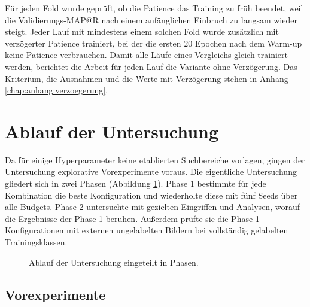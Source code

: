 Für jeden Fold wurde geprüft, ob die Patience das Training zu früh beendet, weil die Validierungs-\ac{MAP@R} nach einem anfänglichen Einbruch zu langsam wieder steigt. Jeder Lauf mit mindestens einem solchen Fold wurde zusätzlich mit verzögerter Patience trainiert, bei der die ersten 20 Epochen nach dem Warm-up keine Patience verbrauchen. Damit alle Läufe eines Vergleichs gleich trainiert werden, berichtet die Arbeit für jeden Lauf die Variante ohne Verzögerung. Das Kriterium, die Ausnahmen und die Werte mit Verzögerung stehen in Anhang \ref{chap:anhang:verzoegerung}. 

\section{Ablauf der Untersuchung}
\label{sec:phasen}	

Da für einige Hyperparameter keine etablierten Suchbereiche vorlagen, gingen der Untersuchung explorative Vorexperimente voraus. Die eigentliche Untersuchung gliedert sich in zwei Phasen (Abbildung \ref{fig:ablauf}). Phase 1 bestimmte für jede Kombination die beste Konfiguration und wiederholte diese mit fünf Seeds über alle Budgets. Phase 2 untersuchte mit gezielten Eingriffen und Analysen, worauf die Ergebnisse der Phase 1 beruhen. Außerdem prüfte sie die Phase-1-Konfigurationen mit externen ungelabelten Bildern bei vollständig gelabelten Trainingsklassen.

\begin{figure}[tbp]
  \centering
  
  \caption[Ablauf der Untersuchung]{Ablauf der Untersuchung eingeteilt in Phasen.}
  \label{fig:ablauf}
\end{figure}

\subsection{Vorexperimente}
\label{sec:m:phase0}


